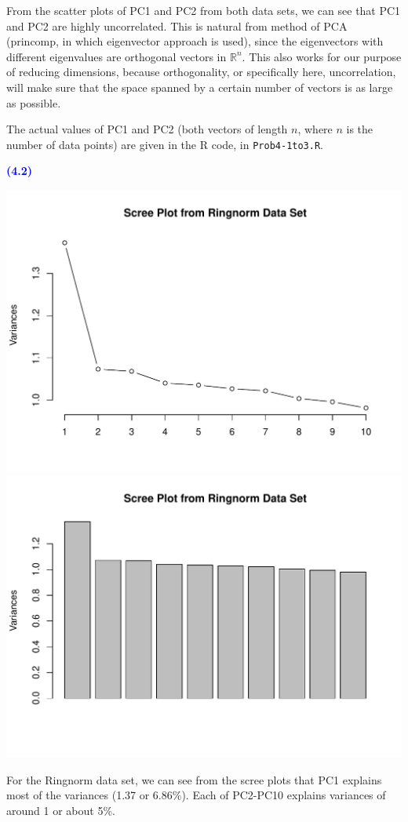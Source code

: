 \documentclass[a4paper,12pt]{article}
\newcommand{\code}[1]{\texttt{#1}}
\newcommand{\qnum}[1]{\noindent\textcolor{blue}{\textbf{(#1)}}}
\begin{document}
From the scatter plots of PC1 and PC2 from both data sets, we can see that PC1 and PC2 are highly uncorrelated. This is natural from method of PCA (princomp, in which eigenvector approach is used), since the eigenvectors with different eigenvalues are orthogonal vectors in $\mathbb{R}^n$. This also works for our purpose of reducing dimensions, because orthogonality, or specifically here, uncorrelation, will make sure that the space spanned by a certain number of vectors is as large as possible.
\bigskip

The actual values of PC1 and PC2 (both vectors of length $n$, where $n$ is the number of data points) are given in the R code, in \code{Prob4-1to3.R}.
\bigskip\bigskip








\qnum{4.2}
\begin{center}
  \includegraphics[width=0.7\linewidth]{Image/Prob4-2-Ringnorm1.pdf}
  \includegraphics[width=0.7\linewidth]{Image/Prob4-2-Ringnorm2.pdf}
\end{center}


For the Ringnorm data set, we can see from the scree plots that PC1 explains most of the variances (1.37 or 6.86\%). 
Each of PC2-PC10 explains variances of around 1 or about 5\%.
\bigskip
\end{document}
